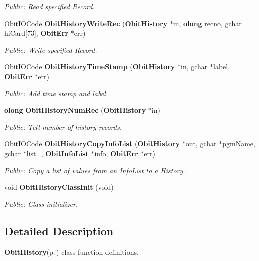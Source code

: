 \begin{CompactItemize}
\begin{CompactList}\small\item\em Public: Read specified Record. \item\end{CompactList}\item 
Obit\-IOCode {\bf Obit\-History\-Write\-Rec} ({\bf Obit\-History} $\ast$in, {\bf olong} recno, gchar hi\-Card[73], {\bf Obit\-Err} $\ast$err)
\begin{CompactList}\small\item\em Public: Write specified Record. \item\end{CompactList}\item 
Obit\-IOCode {\bf Obit\-History\-Time\-Stamp} ({\bf Obit\-History} $\ast$in, gchar $\ast$label, {\bf Obit\-Err} $\ast$err)
\begin{CompactList}\small\item\em Public: Add time stamp and label. \item\end{CompactList}\item 
{\bf olong} {\bf Obit\-History\-Num\-Rec} ({\bf Obit\-History} $\ast$in)
\begin{CompactList}\small\item\em Public: Tell number of history records. \item\end{CompactList}\item 
Obit\-IOCode {\bf Obit\-History\-Copy\-Info\-List} ({\bf Obit\-History} $\ast$out, gchar $\ast$pgm\-Name, gchar $\ast$list[$\,$], {\bf Obit\-Info\-List} $\ast$info, {\bf Obit\-Err} $\ast$err)
\begin{CompactList}\small\item\em Public: Copy a list of values from an Info\-List to a History. \item\end{CompactList}\item 
void {\bf Obit\-History\-Class\-Init} (void)
\begin{CompactList}\small\item\em Public: Class initializer. \item\end{CompactList}\end{CompactItemize}


\subsection{Detailed Description}
{\bf Obit\-History}{\rm (p.\,\pageref{structObitHistory})} class function definitions. 

